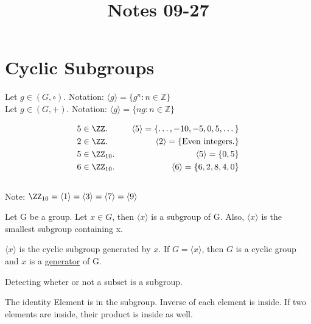 \documentclass[class=scrartcl, crop=false]{standalone}
\title{Notes 09-27}
\begin{document}
\section{Cyclic Subgroups}


\begin{note}
  \hfill \newline
  Let $g \in (G, \circ)$. Notation: $\langle g\rangle = \{g^n: n \in \mathbb{Z}\}$ \\
  Let $g \in (G, +)$. Notation: $\langle g\rangle  = \{ng: n \in \mathbb{Z}\}$
\end{note}

\begin{example}
  \begin{align*}
    5 & \in \ZZ. & \quad\langle 5 \rangle = \{ \dots, -10, -5, 0, 5, \dots \} \\
    2 & \in \ZZ. & \quad\langle 2 \rangle = \{\text{Even integers.}\} \\
    5 & \in \ZZ_{10}. & \quad\langle 5 \rangle = \{0, 5\} \\
    6 & \in \ZZ_{10}. & \quad\langle 6 \rangle = \{6, 2, 8, 4, 0\} \\ \\
  \end{align*}
  Note: $\ZZ_{10} = \langle 1 \rangle = \langle 3 \rangle = \langle 7 \rangle = \langle 9 \rangle $
\end{example}

\begin{theorem}
  Let G be a group. Let $x \in G$, then $\langle x \rangle$ is a subgroup of G. Also, $\langle x \rangle$ is the smallest subgroup containing x.
\end{theorem}

\begin{definition}
  $\langle x \rangle$ is the cyclic subgroup generated by $x$. If $G = \langle x \rangle$, then $G$ is a cyclic group and $x$ is a \ul{generator} of G.
\end{definition}

\begin{definition}
  Detecting wheter or not a subset is a subgroup.
  \begin{enumerate}
    \ii
    The identity Element is in the subgroup.
    \ii
    Inverse of each element is inside.
    \ii
    If two elements are inside, their product is inside as well.
  \end{enumerate}
\end{definition}
\end{document}
